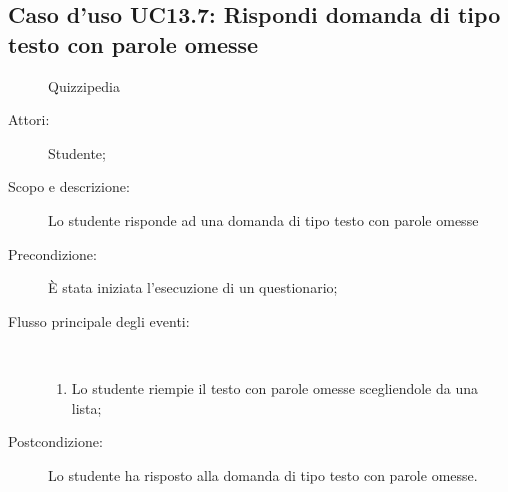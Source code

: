 \subsection{Caso d'uso UC13.7: Rispondi domanda di tipo testo con parole omesse}
	\begin{figure}[H]
		\centering
		\begin{resizedtikzpicture}{\textwidth}
		\begin{umlsystem}[x=0, fill=lightgray!20]{Quizzipedia}
		\end{umlsystem}
		\end{resizedtikzpicture}
		\caption{}
	\end{figure}
\begin{description}
\item[Attori:] Studente;
\item[Scopo e descrizione:] Lo studente risponde ad una domanda di tipo testo con parole omesse
      \item[Precondizione:] È stata iniziata l'esecuzione di un questionario;

        \item[Flusso principale degli eventi:] \ 
 \begin{enumerate}
          \item Lo studente riempie il testo con parole omesse scegliendole da una lista;

      \end{enumerate}
    \item[Postcondizione:] Lo studente ha risposto alla domanda di tipo testo con parole omesse.
  \end{description}
\hypertarget{UC13.8}{}
